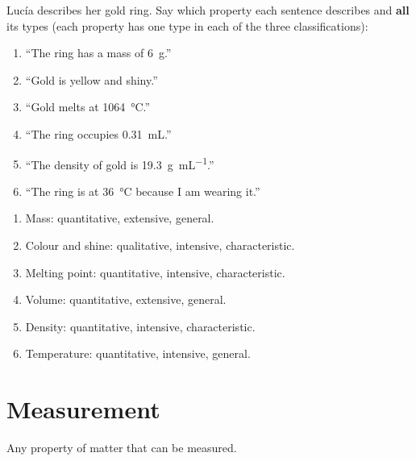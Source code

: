 \begin{exercise}
    Lucía describes her gold ring. Say which property each sentence describes and \textbf{all} its types (each property has one type in each of the three classifications):
    \begin{enumerate}[label=\letraminuscula]
        \item ``The ring has a mass of \qty{6}{\g}.''
        \item ``Gold is yellow and shiny.''
        \item ``Gold melts at \qty{1064}{\celsius}.''
        \item ``The ring occupies \qty{0.31}{\mL}.''
        \item ``The density of gold is \qty{19.3}{\g\per\mL}.''
        \item ``The ring is at \qty{36}{\celsius} because I am wearing it.''
    \end{enumerate}
    \begin{solu}
        \begin{enumerate}[label=\alph*)]
            \item Mass: quantitative, extensive, general.
            \item Colour and shine: qualitative, intensive, characteristic.
            \item Melting point: quantitative, intensive, characteristic.
            \item Volume: quantitative, extensive, general.
            \item Density: quantitative, intensive, characteristic.
            \item Temperature: quantitative, intensive, general.
        \end{enumerate}
    \end{solu}
\end{exercise}




\section{Measurement}

\providecommand{\cancelunit}[1]{\cancelred{\unit{#1}}}

\begin{definition}[Quantity]
    Any property of matter that can be measured.
\end{definition}


